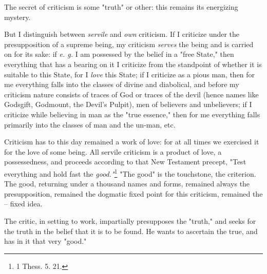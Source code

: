 \documentclass[a4paper]{book}
\begin{document}
The secret of criticism is some "{}truth"{} or other: this remains its 
energizing mystery.

But I distinguish between \textit{servile} and \textit{own} criticism. If I 
criticize under the presupposition of a supreme being, my criticism 
\textit{serves} the being and is carried on for its sake: if \textit{e. g.} I 
am possessed by the belief in a "{}free State,"{} then everything that has a 
bearing on it I criticize from the standpoint of whether it is suitable to 
this State, for I \textit{love} this State; if I criticize as a pious man, 
then for me everything falls into the classes of divine and diabolical, and 
before my criticism nature consists of traces of God or traces of the devil 
(hence names like Godsgift, Godmount, the Devil's Pulpit), men of believers 
and unbelievers; if I criticize while believing in man as the "{}true 
essence,"{} then for me everything falls primarily into the classes of man and 
the un-man, etc.

Criticism has to this day remained a work of love: for at all times we 
exercised it for the love of some being. All servile criticism is a product of 
love, a possessedness, and proceeds according to that New Testament precept, 
"{}Test everything and hold fast the \textit{good."{}}\footnote{1 Thess. 5. 
21.} "{}The good"{} is the touchstone, the criterion. The good, returning 
under a thousand names and forms, remained always the presupposition, remained 
the dogmatic fixed point for this criticism, remained the -- fixed idea.

The critic, in setting to work, impartially presupposes the "{}truth,"{} and 
seeks for the truth in the belief that it is to be found. He wants to 
ascertain the true, and has in it that very "{}good."{}
\end{document}
